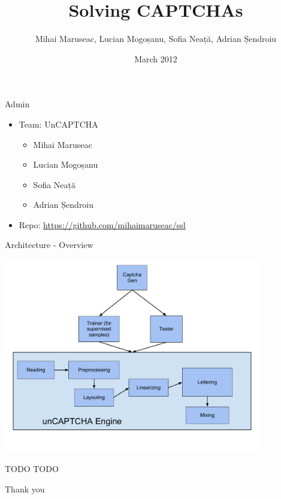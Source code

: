 \documentclass[red]{beamer}
\begin{document}
\title{Solving CAPTCHAs}
\author[MM, LM, SN, AS]{Mihai Maruseac, Lucian Mogoșanu, Sofia Neață, Adrian Șendroiu}
\date{March 2012}


\maketitle

\begin{frame}{Admin}
  \begin{itemize}
    \item Team: UnCAPTCHA
      \begin{itemize}
        \item Mihai Maruseac
        \item Lucian Mogoșanu
        \item Sofia Neață
        \item Adrian Șendroiu
      \end{itemize}
    \item Repo: \url{https://github.com/mihaimaruseac/ssl}
  \end{itemize}
\end{frame}

\begin{frame}{Architecture - Overview}
  \begin{center}
    \includegraphics[width=0.85\textwidth]{img/unCAPTCHAarchitecturedraft.pdf}
  \end{center}
\end{frame}

\begin{frame}{TODO}
  TODO
\end{frame}

\begin{frame}{Thank you}
  \begin{center}
  \end{center}
\end{frame}
\end{document}
